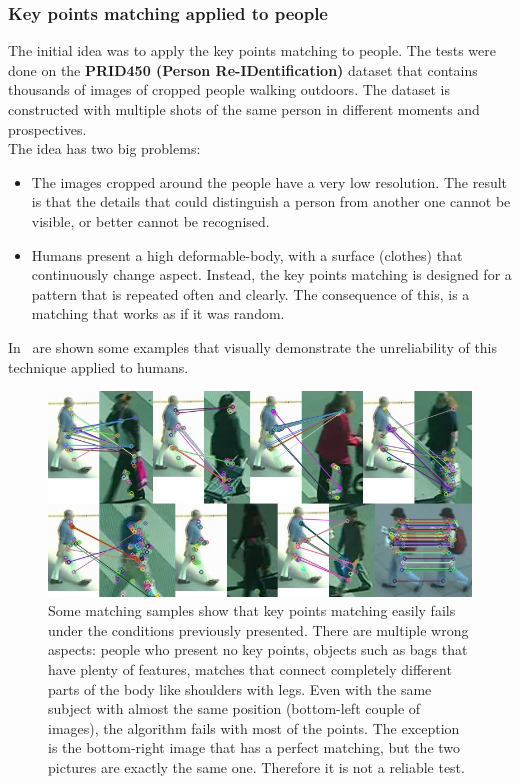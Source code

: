 \subsubsection*{Key points matching applied to people}
The initial idea was to apply the key points matching to people. The tests were done on the \textbf{PRID450 (Person Re-IDentification)}\cite{prid450} dataset that contains thousands of images of cropped people walking outdoors. The dataset is constructed with multiple shots of the same person in different moments and prospectives.\\
The idea has two big problems:
\begin{itemize}
	\item The images cropped around the people have a very low resolution. The result is that the details that could distinguish a person from another one cannot be visible, or better cannot be recognised.
	\item Humans present a high deformable-body, with a surface (clothes) that continuously change aspect. Instead, the key points matching is designed for a pattern that is repeated often and clearly. The consequence of this, is a matching that works as if it was random.
\end{itemize}
In~ are shown some examples that visually demonstrate the unreliability of this technique applied to humans.

\begin{figure}[!h]
	\centering
	\includegraphics[width=\linewidth]{images/recognition/kpSample_all}
	\captionsetup{margin=0.5cm}
	\caption[Key points matching samples of people comparison.]{Some matching samples show that key points matching easily fails under the conditions previously presented. There are multiple wrong aspects: people who present no key points, objects such as bags that have plenty of features, matches that connect completely different parts of the body like shoulders with legs. Even with the same subject with almost the same position (bottom-left couple of images), the algorithm fails with most of the points. The exception is the bottom-right image that has a perfect matching, but the two pictures are exactly the same one. Therefore it is not a reliable test.}
	\label{fig:kpMatch_samples}
\end{figure}


